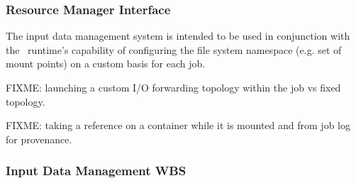 \subsubsection{Resource Manager Interface}

The input data management system is intended to be used in conjunction with
the \ngrm\ runtime's capability of configuring the file system
namespace (e.g. set of mount points) on a custom basis for each job. 

FIXME: launching a custom I/O forwarding topology within the job
vs fixed topology.

FIXME: taking a reference on a container while it is mounted and
from job log for provenance.

\subsubsection{Input Data Management WBS}

